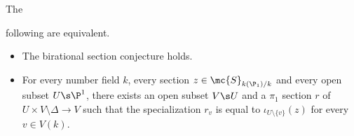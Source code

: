 


\begin{TC}
\notready
	\hypertarget{TC}{The} following are equivalent.
	\begin{itemize}
		\item The birational section conjecture holds.
		\item For every number field $k$, every section $z\in\mc{S}_{k(\P_{1})/k}$ and every open subset $U\s\P^{1}$, there exists an open subset $V\s U$ and a $\pi_{1}$ section $r$ of $U\times V\setminus\Delta \to V$ such that the specialization $r_{v}$ is equal to $\iota_{U\setminus\{v\}}(z)$ for every $v\in V(k)$.
	\end{itemize}
\end{TC}

